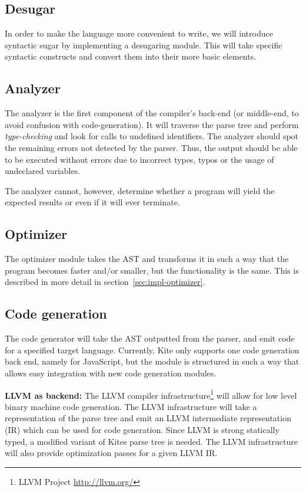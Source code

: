 \subsection{Desugar}
In order to make the language more convenient to write, we will introduce syntactic sugar by implementing a desugaring module. This will take specific syntactic constructs and convert them into their more basic elements.


\subsection{Analyzer}
The analyzer is the first component of the compiler's back-end (or middle-end, to avoid confusion with code-generation). It will traverse the parse tree and perform \emph{type-checking} and look for calls to undefined identifiers. The analyzer should spot the remaining errors not detected by the parser. Thus, the output should be able to be executed without errors due to incorrect types, typos or the usage of undeclared variables.

The analyzer cannot, however, determine whether a program will yield the expected results or even if it will ever terminate.


\subsection{Optimizer}
The optimizer module takes the AST and transforms it in such a way that the program becomes faster and/or smaller, but the functionality is the same. This is described in more detail in section~\ref{sec:impl-optimizer}.


\subsection{Code generation}
The code generator will take the AST outputted from the parser, and emit code for a specified target language. Currently, Kite only supports one code generation back end, namely for JavaScript, but the module is structured in such a way that allows easy integration with new code generation modules.

\textbf{LLVM as backend:}
The LLVM compiler infrastructure\footnote{LLVM Project \url{http://llvm.org/}} will allow for low level binary machine code generation. The LLVM infrastructure will take a representation of the parse tree and emit an LLVM intermediate representation (IR) which can be used for code generation. Since LLVM is strong statically typed, a modified variant of Kites parse tree is needed. The LLVM infrastructure will also provide optimization passes for a given LLVM IR.

